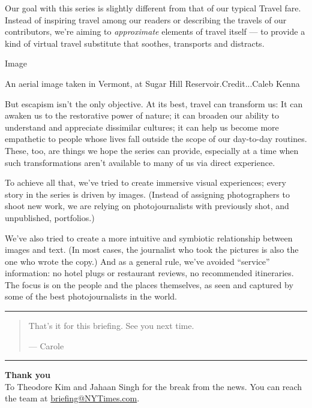 Our goal with this series is slightly different from that of our typical
Travel fare. Instead of inspiring travel among our readers or describing
the travels of our contributors, we're aiming to \emph{approximate}
elements of travel itself --- to provide a kind of virtual travel
substitute that soothes, transports and distracts.

Image

An aerial image taken in Vermont, at Sugar Hill Reservoir.Credit...Caleb
Kenna

But escapism isn't the only objective. At its best, travel can transform
us: It can awaken us to the restorative power of nature; it can broaden
our ability to understand and appreciate dissimilar cultures; it can
help us become more empathetic to people whose lives fall outside the
scope of our day-to-day routines. These, too, are things we hope the
series can provide, especially at a time when such transformations
aren't available to many of us via direct experience.

To achieve all that, we've tried to create immersive visual experiences;
every story in the series is driven by images. (Instead of assigning
photographers to shoot new work, we are relying on photojournalists with
previously shot, and unpublished, portfolios.)

We've also tried to create a more intuitive and symbiotic relationship
between images and text. (In most cases, the journalist who took the
pictures is also the one who wrote the copy.) And as a general rule,
we've avoided ``service'' information: no hotel plugs or restaurant
reviews, no recommended itineraries. The focus is on the people and the
places themselves, as seen and captured by some of the best
photojournalists in the world.

\begin{center}\rule{0.5\linewidth}{\linethickness}\end{center}

\begin{quote}
That's it for this briefing. See you next time.

--- Carole
\end{quote}

\begin{center}\rule{0.5\linewidth}{\linethickness}\end{center}

\textbf{Thank you}\\
To Theodore Kim and Jahaan Singh for the break from the news. You can
reach the team at
\href{mailto:briefing+pm@NYTimes.com?subject=Briefing\%20Feedback}{briefing@NYTimes.com}.

